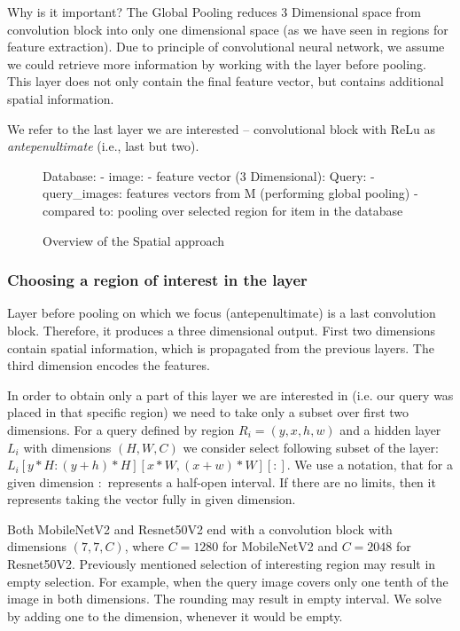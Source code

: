 Why is it important? The Global Pooling reduces 3 Dimensional space from convolution block into only one dimensional space (as we have seen in regions for feature extraction). Due to principle of convolutional neural network, we assume we could retrieve more information by working with the layer before pooling. This layer does not only contain the final feature vector, but contains additional spatial information.

We refer to the last layer we are interested -- convolutional block with ReLu as \emph{antepenultimate} (i.e., last but two). 

\begin{figure}
\centering
\begin{boxedverbatim}
Database:
    - image:
        - feature vector (3 Dimensional):
Query:
    - query_images: features vectors from M (performing global pooling)
    - compared to: pooling over selected region for item 
                   in the database
\end{boxedverbatim}
\caption{Overview of the Spatial approach}
\end{figure}


\subsubsection{Choosing a region of interest in the layer}

Layer before pooling on which we focus (antepenultimate) is a last convolution block. Therefore, it produces a three dimensional output. First two dimensions contain spatial information, which is propagated from the previous layers. The third dimension encodes the features.

In order to obtain only a part of this layer we are interested in (i.e. our query was placed in that specific region) we need to take only a subset over first two dimensions. For a query defined by region $R_i = (y, x, h, w)$ and a hidden layer $L_i$ with dimensions $(H, W, C)$ we consider select following subset of the layer: $L_i[y * H: (y+h) * H][x*W, (x + w) * W][:]$. We use a notation, that for a given dimension $:$ represents a half-open interval. If there are no limits, then it represents taking the vector fully in given dimension.

Both MobileNetV2 and Resnet50V2 end with a convolution block with dimensions $(7,7,C)$, where $C = 1280$ for MobileNetV2 and $C = 2048$ for Resnet50V2. Previously mentioned selection of interesting region may result in empty selection. For example, when the query image covers only one tenth of the image in both dimensions. The rounding may result in empty interval. We solve by adding one to the dimension, whenever it would be empty.

